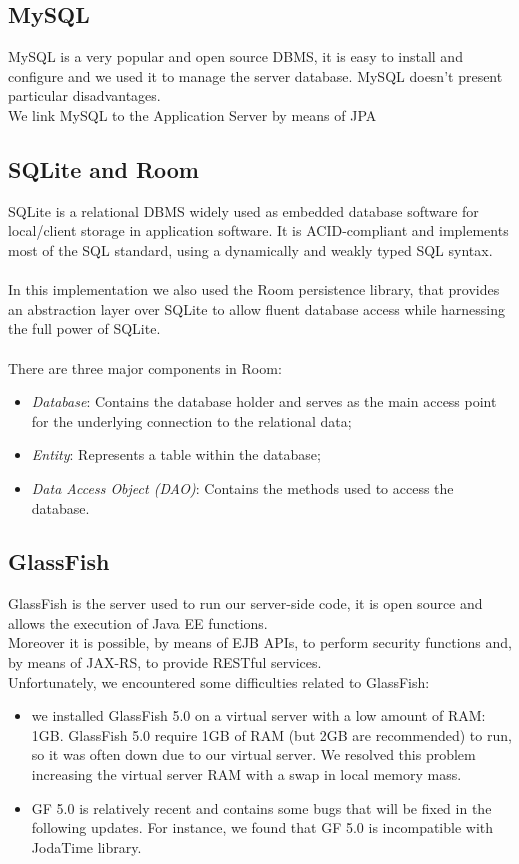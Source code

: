 \subsection{MySQL}
\label{subsec:Middleware}
MySQL is a very popular and open source DBMS, it is easy to install and configure and we used it to manage the server database. MySQL doesn't present particular disadvantages.\\
We link MySQL to the Application Server by means of JPA
\subsection{SQLite and Room}
\label{subsec:SQLite and Room}
SQLite is a relational DBMS widely used as embedded database software for local/client storage in application software. It is ACID-compliant and implements most of the SQL standard, using a dynamically and weakly typed SQL syntax. \\\\
In this implementation we also used the Room persistence library, that provides an abstraction layer over SQLite to allow fluent database access while harnessing the full power of SQLite. \\\\
There are three major components in Room:
\begin{itemize}
\item \textit{Database}: Contains the database holder and serves as the main access point for the underlying connection to the relational data;
\item \textit{Entity}: Represents a table within the database;
\item \textit{Data Access Object (DAO)}: Contains the methods used to access the database.
\end{itemize}
\subsection{GlassFish}
\label{subsec:GlassFish}
GlassFish is the server used to run our server-side code, it is open source and allows the execution of Java EE functions.\\ 
Moreover it is possible, by means of EJB APIs, to perform security functions and, by means of JAX-RS, to provide RESTful services. \\ 
Unfortunately, we encountered some difficulties related to GlassFish: 
\begin{itemize}
\item we installed GlassFish 5.0 on a virtual server with a low amount of RAM: 1GB. GlassFish 5.0 require 1GB of RAM (but 2GB are recommended) to run, so it was often down due to our virtual server. We resolved this problem increasing the virtual server RAM with a swap in local memory mass.
\item GF 5.0 is relatively recent and contains some bugs that will be fixed in the following updates. For instance, we found that GF 5.0 is incompatible with JodaTime library. 
\end{itemize}